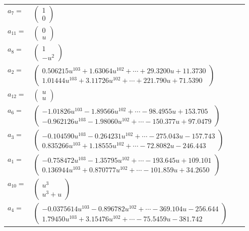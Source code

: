 \documentclass[1p]{elsarticle_modified}
\theoremstyle{definition}
\begin{document}
\begin{tabular}{m{7pt} m{180pt} m{7pt} m{180pt} }
\flushright $a_{7}=$&$\begin{pmatrix}1\\0\end{pmatrix}$ \\
\flushright $a_{11}=$&$\begin{pmatrix}0\\u\end{pmatrix}$ \\
\flushright $a_{8}=$&$\begin{pmatrix}1\\- u^2\end{pmatrix}$ \\
\flushright $a_{2}=$&$\begin{pmatrix}0.506215 u^{103}+1.63064 u^{102}+\cdots+29.3200 u+11.3730\\1.01444 u^{103}+3.11726 u^{102}+\cdots+221.790 u+71.5390\end{pmatrix}$ \\
\flushright $a_{12}=$&$\begin{pmatrix}u\\u\end{pmatrix}$ \\
\flushright $a_{6}=$&$\begin{pmatrix}-1.01826 u^{103}-1.89566 u^{102}+\cdots-98.4955 u+153.705\\-0.962126 u^{103}-1.98060 u^{102}+\cdots-150.377 u+97.0479\end{pmatrix}$ \\
\flushright $a_{3}=$&$\begin{pmatrix}-0.104590 u^{103}-0.264231 u^{102}+\cdots-275.043 u-157.743\\0.835266 u^{103}+1.18555 u^{102}+\cdots-72.8082 u-246.443\end{pmatrix}$ \\
\flushright $a_{1}=$&$\begin{pmatrix}-0.758472 u^{103}-1.35795 u^{102}+\cdots-193.645 u+109.101\\0.136944 u^{103}+0.870777 u^{102}+\cdots-101.859 u+34.2650\end{pmatrix}$ \\
\flushright $a_{10}=$&$\begin{pmatrix}u^3\\u^3+u\end{pmatrix}$ \\
\flushright $a_{4}=$&$\begin{pmatrix}-0.0375614 u^{103}-0.896782 u^{102}+\cdots-369.104 u-256.644\\1.79450 u^{103}+3.15476 u^{102}+\cdots-75.5459 u-381.742\end{pmatrix}$ \\

\end{tabular}
\end{document}
